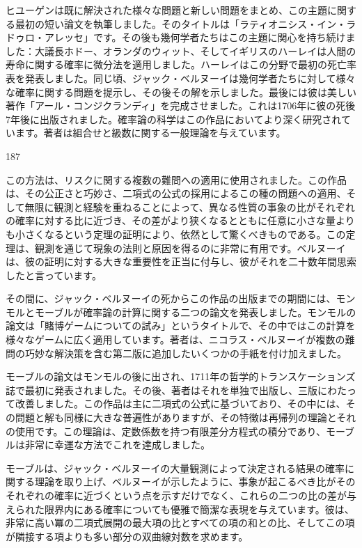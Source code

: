 \documentclass[a4paper,11pt,openany]{ltjsbook}
\begin{document}
ヒユーゲンは既に解決された様々な問題と新しい問題をまとめ、この主題に関する最初の短い論文を執筆しました。そのタイトルは「ラティオニシス・イン・ラドゥロ・アレッセ」です。その後も幾何学者たちはこの主題に関心を持ち続けました：大議長ホドー、オランダのウィット、そしてイギリスのハーレイは人間の寿命に関する確率に微分法を適用しました。ハーレイはこの分野で最初の死亡率表を発表しました。同じ頃、ジャック・ベルヌーイは幾何学者たちに対して様々な確率に関する問題を提示し、その後その解を示しました。最後には彼は美しい著作「アール・コンジクランディ」を完成させました。これは1706年に彼の死後7年後に出版されました。確率論の科学はこの作品においてより深く研究されています。著者は組合せと級数に関する一般理論を与えています。

187

この方法は、リスクに関する複数の難問への適用に使用されました。この作品は、その公正さと巧妙さ、二項式の公式の採用によるこの種の問題への適用、そして無限に観測と経験を重ねることによって、異なる性質の事象の比がそれぞれの確率に対する比に近づき、その差がより狭くなるとともに任意に小さな量よりも小さくなるという定理の証明により、依然として驚くべきものである。この定理は、観測を通じて現象の法則と原因を得るのに非常に有用です。ベルヌーイは、彼の証明に対する大きな重要性を正当に付与し、彼がそれを二十数年間思索したと言っています。

その間に、ジャック・ベルヌーイの死からこの作品の出版までの期間には、モンモルとモーブルが確率論の計算に関する二つの論文を発表しました。モンモルの論文は「賭博ゲームについての試み」というタイトルで、その中ではこの計算を様々なゲームに広く適用しています。著者は、ニコラス・ベルヌーイが複数の難問の巧妙な解決策を含む第二版に追加したいくつかの手紙を付け加えました。

モーブルの論文はモンモルの後に出され、1711年の哲学的トランスケーションズ誌で最初に発表されました。その後、著者はそれを単独で出版し、三版にわたって改善しました。この作品は主に二項式の公式に基づいており、その中には、その問題と解も同様に大きな普遍性がありますが、その特徴は再帰列の理論とそれの使用です。この理論は、定数係数を持つ有限差分方程式の積分であり、モーブルは非常に幸運な方法でこれを達成しました。

モーブルは、ジャック・ベルヌーイの大量観測によって決定される結果の確率に関する理論を取り上げ、ベルヌーイが示したように、事象が起こるべき比がそのそれぞれの確率に近づくという点を示すだけでなく、これらの二つの比の差が与えられた限界内にある確率についても優雅で簡潔な表現を与えています。彼は、非常に高い冪の二項式展開の最大項の比とすべての項の和との比、そしてこの項が隣接する項よりも多い部分の双曲線対数を求めます。
\end{document}
